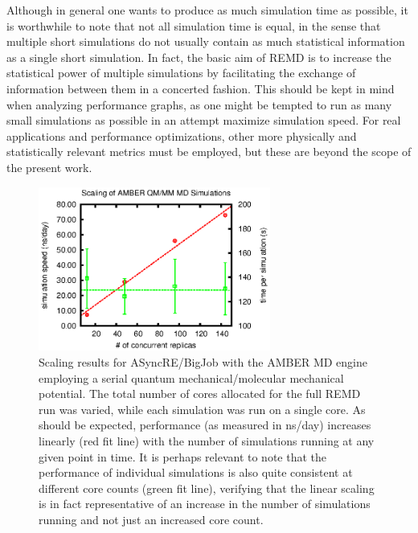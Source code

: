 Although in general one wants to produce as much simulation time as possible,
it is worthwhile to note that not all simulation time is equal, in the sense
that multiple short simulations do not usually contain as much statistical
information as a single short simulation. In fact, the basic aim of REMD is to
increase the statistical power of multiple simulations by facilitating the
exchange of information between them in a concerted fashion. This should be
kept in mind when analyzing performance graphs, as one might be tempted to run
as many small simulations as possible in an attempt maximize simulation speed.
For real applications and performance optimizations, other more physically and
statistically relevant metrics must be employed, but these are beyond the
scope of the present work.

\begin{figure}
\includegraphics[width=3in]{amber_data/qmmm.eps}
\caption{
  Scaling results for ASyncRE/BigJob with the AMBER MD engine employing a
  serial quantum mechanical/molecular mechanical potential. The total number
  of cores allocated for the full REMD run was varied, while each simulation
  was run on a single core. As should be expected, performance (as measured in
  ns/day) increases linearly (red fit line) with the number of simulations 
  running at any given point in time. It is perhaps relevant to note that the
  performance of individual simulations is also quite consistent at different
  core counts (green fit line), verifying that the linear scaling is in fact
  representative of an increase in the number of simulations running and not
  just an increased core count.
  \label{fig:amber_qmmm}  
}
\end{figure}


